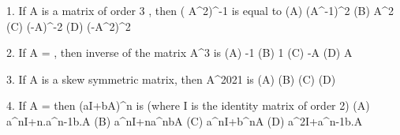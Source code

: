 % 
% 
% 
% 
% 
% 
% 
% 
% 
1. If A is a matrix of order 3 , then \left( A^2\right)^{-1} is equal to
(A) \left(A^{-1}\right)^2 \qquad \qquad \qquad \qquad \qquad (B) A^2
(C) \left(-A\right)^{-2} \qquad \qquad \qquad \qquad \qquad (D) \left(-A^2\right)^2

2. If A =   \left[ \begin{array}{cc} 2 & -1 \\ 3 & -2 \end{array}\right] , then inverse of the matrix A^3 is
(A) -1 \qquad \qquad \qquad \qquad \qquad (B) 1
(C) -A \qquad \qquad \qquad \qquad \qquad (D) A

3. If A is a skew symmetric matrix, then A^{2021} is
(A)  \qquad \qquad \qquad \qquad \qquad \qquad \qquad (B) 
(C)  \qquad \qquad \qquad \qquad \qquad (D) 

4. If A =   \left[ \begin{array}{cc} 0 & 1 \\ 0 & 0 \end{array}\right] then \left(aI+bA\right)^n is (where I is the identity matrix of order 2)
(A) a^nI+n.a^{n-1}b.A \qquad \qquad \qquad \quad (B)  a^nI+na^nbA
(C) a^nI+b^nA \qquad \qquad \qquad \qquad \qquad (D)  a^2I+a^{n-1}b.A

